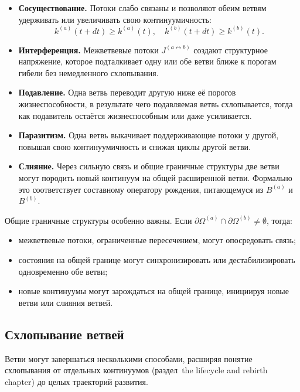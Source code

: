 \begin{itemize}
  \item \textbf{Сосуществование.}\quad
        Потоки слабо связаны и позволяют обеим ветвям удерживать или увеличивать
        свою континуумичность:
        \[
          k^{(a)}(t+dt) \ge k^{(a)}(t),\quad
          k^{(b)}(t+dt) \ge k^{(b)}(t).
        \]
  \item \textbf{Интерференция.}\quad
        Межветвевые потоки \(J^{(a\leftrightarrow b)}\) создают
        структурное напряжение, которое подталкивает одну или обе ветви
        ближе к порогам гибели без немедленного схлопывания.
  \item \textbf{Подавление.}\quad
        Одна ветвь переводит другую ниже её порогов жизнеспособности,
        в результате чего подавляемая ветвь схлопывается, тогда как
        подавитель остаётся жизнеспособным или даже усиливается.
  \item \textbf{Паразитизм.}\quad
        Одна ветвь выкачивает поддерживающие потоки у другой, повышая свою
        континуумичность и снижая циклы другой ветви.
  \item \textbf{Слияние.}\quad
        Через сильную связь и общие граничные структуры две ветви могут
        породить новый континуум на общей расширенной ветви. Формально это
        соответствует составному оператору рождения, питающемуся из
        \(B^{(a)}\) и \(B^{(b)}\).
\end{itemize}

Общие граничные структуры особенно важны. Если
\(\partial\Omega^{(a)}\cap\partial\Omega^{(b)}\neq\emptyset\), тогда:
\begin{itemize}
  \item межветвевые потоки, ограниченные пересечением, могут опосредовать
        связь;
  \item состояния на общей границе могут синхронизировать или
        дестабилизировать одновременно обе ветви;
  \item новые континуумы могут зарождаться на общей границе, инициируя новые
        ветви или слияния ветвей.
\end{itemize}

\subsection{Схлопывание ветвей}

Ветви могут завершаться несколькими способами, расширяя понятие
схлопывания от отдельных континуумов
(раздел~the lifecycle and rebirth chapter) до целых траекторий развития.

